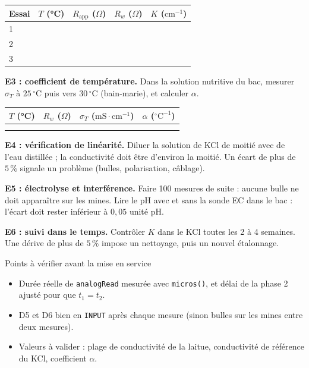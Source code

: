 \documentclass[11pt,a4paper]{article}
\newcommand{\ligne}{\arrayrulecolor{ligneENO}\specialrule{0.4pt}{0pt}{0pt}\arrayrulecolor{black}}
\newcommand{\U}[1]{\,\mathrm{#1}}
\begin{document}
\begin{center}
\begin{tabular}{p{2.4cm} p{2.4cm} p{2.6cm} p{2.6cm} p{2.6cm}}
\toprule
\textbf{Essai} & \textbf{$T$ (°C)} & \textbf{$R_{\text{app}}$ ($\Omega$)} & \textbf{$R_w$ ($\Omega$)} & \textbf{$K$ ($\mathrm{cm^{-1}}$)} \\
\midrule
1 & & & & \\ \ligne
2 & & & & \\ \ligne
3 & & & & \\
\bottomrule
\end{tabular}
\end{center}

\textbf{E3 : coefficient de température.} Dans la solution nutritive du bac, mesurer $\sigma_T$ à $25\U{{}^{\circ}C}$ puis vers $30\U{{}^{\circ}C}$ (bain-marie), et calculer $\alpha$.

\begin{center}
\begin{tabular}{p{3.2cm} p{3.2cm} p{3.4cm} p{3.2cm}}
\toprule
\textbf{$T$ (°C)} & \textbf{$R_w$ ($\Omega$)} & \textbf{$\sigma_T$ ($\mathrm{mS \cdot cm^{-1}}$)} & \textbf{$\alpha$ ($\mathrm{{}^{\circ}C^{-1}}$)} \\
\midrule
& & & \\ \ligne
& & & \\
\bottomrule
\end{tabular}
\end{center}

\textbf{E4 : vérification de linéarité.} Diluer la solution de KCl de moitié avec de l'eau distillée ; la conductivité doit être d'environ la moitié. Un écart de plus de $5\U{\%}$ signale un problème (bulles, polarisation, câblage).

\textbf{E5 : électrolyse et interférence.} Faire 100 mesures de suite : aucune bulle ne doit apparaître sur les mines. Lire le pH avec et sans la sonde EC dans le bac : l'écart doit rester inférieur à $0{,}05$ unité pH.

\textbf{E6 : suivi dans le temps.} Contrôler $K$ dans le KCl toutes les 2 à 4 semaines. Une dérive de plus de $5\U{\%}$ impose un nettoyage, puis un nouvel étalonnage.

\begin{alerte}{Points à vérifier avant la mise en service}
\begin{itemize}[nosep]
\item Durée réelle de \texttt{analogRead} mesurée avec \texttt{micros()}, et délai de la phase 2 ajusté pour que $t_1 = t_2$.
\item D5 et D6 bien en \texttt{INPUT} après chaque mesure (sinon bulles sur les mines entre deux mesures).
\item Valeurs à valider : plage de conductivité de la laitue, conductivité de référence du KCl, coefficient $\alpha$.
\end{itemize}
\end{alerte}
\end{document}
